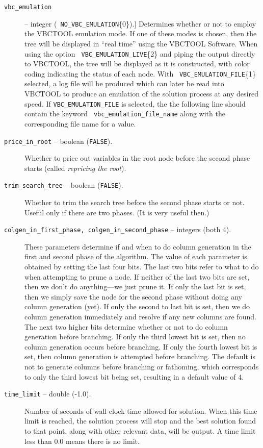 \begin{description}
\item[{\tt vbc\_emulation}] -- integer ({\tt
NO\_VBC\_EMULATION}\{0\}).]
Determines whether or not to employ the VBCTOOL emulation mode. If
one of these modes is chosen, then the tree will be displayed in
``real time'' using the VBCTOOL Software. When using the option {\tt
VBC\_EMULATION\_LIVE}\{2\} and piping the output directly to VBCTOOL, the
tree will be displayed as it is constructed, with color coding
indicating the status of each node. With {\tt
VBC\_EMULATION\_FILE}\{1\} selected, a log file will be produced which
can later be read into VBCTOOL to produce an emulation of the
solution process at any desired speed. If {\tt VBC\_EMULATION\_FILE}
is selected, the the following line should contain the keyword {\tt
vbc\_emulation\_file\_name} along with the corresponding file name
for a value.

\item[{\tt price\_in\_root} -- boolean ({\tt FALSE}).]
Whether to price out variables in the root node before the second
phase starts (called {\em repricing the root}). 

\item[{\tt trim\_search\_tree} -- boolean ({\tt FALSE}).]
Whether to trim the search tree before the second phase starts or not. Useful
only if there are two phases. (It is very useful then.)

\item[{\tt colgen\_in\_first\_phase, colgen\_in\_second\_phase} --
integers (both 4).] These parameters determine if and when to do
column generation in the first and second phase of the algorithm. The
value of each parameter is obtained by setting the last four bits.
The last two bits refer to what to do when attempting to prune a node.
If neither of the last two bits are set, then we don't do
anything---we just prune it. If only the last bit is set, then we
simply save the node for the second phase without doing any column
generation (yet). If only the second to last bit is set, then we do
column generation immediately and resolve if any new columns are
found. The next two higher bits determine whether or not to do column
generation before branching. If only the third lowest bit is set, then no
column generation occurs before branching. If only the fourth lowest bit is
set, then column generation is attempted before branching. The default
is not to generate columns before branching or fathoming, which
corresponds to only the third lowest bit being set, resulting in a
default value of 4.

\item[{\tt time\_limit} -- double (-1.0).]
Number of seconds of wall-clock time allowed for solution. When this
time limit is reached, the solution process will stop and the best
solution found to that point, along with other relevant data, will be
output. A time limit less than 0.0 means there is no limit.


\end{description}
